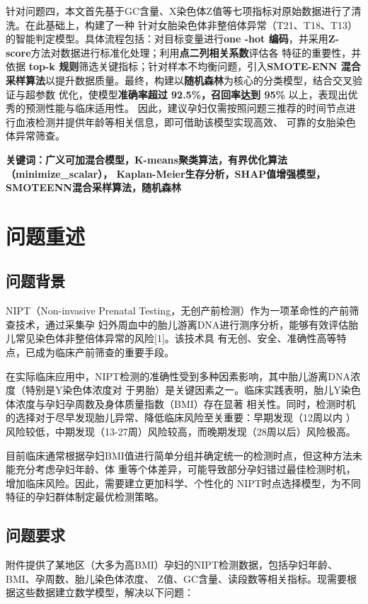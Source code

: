 \documentclass{article}
\begin{document}
针对问题四，本文首先基于GC含量、X染色体Z值等七项指标对原始数据进行了清洗。在此基础上，构建了一种
针对女胎染色体非整倍体异常（T21、T18、T13）的智能判定模型。具体流程包括：对目标变量进行\textbf{one
    -hot 编码}，并采用\textbf{Z-score}方法对数据进行标准化处理；利用\textbf{点二列相关系数}评估各
特征的重要性，并依据 \textbf{top-k 规则}筛选关键指标；针对样本不均衡问题，引入\textbf{SMOTE-ENN
    混合采样算法}以提升数据质量。最终，构建以\textbf{随机森林}为核心的分类模型，结合交叉验证与超参数
优化，使模型\textbf{准确率超过 92.5\%，召回率达到 95\%} 以上，表现出优秀的预测性能与临床适用性。
因此，建议孕妇仅需按照问题三推荐的时间节点进行血液检测并提供年龄等相关信息，即可借助该模型实现高效、
可靠的女胎染色体异常筛查。

\textbf{关键词：广义可加混合模型，K-means聚类算法，有界优化算法（minimize\_scalar），
    Kaplan-Meier生存分析，SHAP值增强模型，SMOTEENN混合采样算法，随机森林}
\newpage
\section{\textbf{问题重述}}
\subsection{\textbf{问题背景}}
NIPT（Non-invasive Prenatal Testing，无创产前检测）作为一项革命性的产前筛查技术，通过采集孕
妇外周血中的胎儿游离DNA进行测序分析，能够有效评估胎儿常见染色体非整倍体异常的风险[1]。该技术具
有无创、安全、准确性高等特点，已成为临床产前筛查的重要手段。

在实际临床应用中，NIPT检测的准确性受到多种因素影响，其中胎儿游离DNA浓度（特别是Y染色体浓度对
于男胎）是关键因素之一。临床实践表明，胎儿Y染色体浓度与孕妇孕周数及身体质量指数（BMI）存在显著
相关性。同时，检测时机的选择对于尽早发现胎儿异常、降低临床风险至关重要：早期发现（12周以内
）风险较低，中期发现（13-27周）风险较高，而晚期发现（28周以后）风险极高。

目前临床通常根据孕妇BMI值进行简单分组并确定统一的检测时点，但这种方法未能充分考虑孕妇年龄、体
重等个体差异，可能导致部分孕妇错过最佳检测时机，增加临床风险。因此，需要建立更加科学、个性化的
NIPT时点选择模型，为不同特征的孕妇群体制定最优检测策略。

\subsection{\textbf{问题要求}}
附件提供了某地区（大多为高BMI）孕妇的NIPT检测数据，包括孕妇年龄、BMI、孕周数、胎儿染色体浓度、
Z值、GC含量、读段数等相关指标。现需要根据这些数据建立数学模型，解决以下问题：
\end{document}
